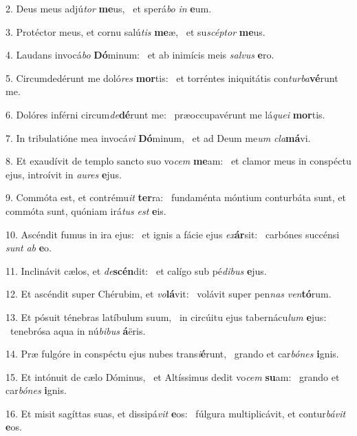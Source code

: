 2. Deus meus adjú\textit{tor} \textbf{me}us, \ast\  et sperá\textit{bo} \textit{in} \textbf{e}um.\

3. Protéctor meus, et cornu salú\textit{tis} \textbf{me}æ, \ast\  et su\textit{scép}\textit{tor} \textbf{me}us.\

4. Laudans invocá\textit{bo} \textbf{Dó}minum: \ast\  et ab inimícis meis \textit{sal}\textit{vus} \textbf{e}ro.\

5. Circumdedérunt me doló\textit{res} \textbf{mor}tis: \ast\  et torréntes iniquitátis con\textit{tur}\textit{ba}\textbf{vé}runt me.\

6. Dolóres inférni circum\textit{de}\textbf{dé}runt me: \ast\  præoccupavérunt me lá\textit{que}\textit{i} \textbf{mor}tis.\

7. In tribulatióne mea invocá\textit{vi} \textbf{Dó}minum, \ast\  et ad Deum me\textit{um} \textit{cla}\textbf{má}vi.\

8. Et exaudívit de templo sancto suo vo\textit{cem} \textbf{me}am: \ast\  et clamor meus in conspéctu ejus, introívit in \textit{au}\textit{res} \textbf{e}jus.\

9. Commóta est, et contrému\textit{it} \textbf{ter}ra: \ast\  fundaménta móntium conturbáta sunt, et commóta sunt, quóniam irá\textit{tus} \textit{est} \textbf{e}is.\

10. Ascéndit fumus in ira ejus: \dag\  et ignis a fácie ejus \textit{ex}\textbf{ár}sit: \ast\  carbónes succénsi \textit{sunt} \textit{ab} \textbf{e}o.\

11. Inclinávit cælos, et \textit{de}\textbf{scén}dit: \ast\  et calígo sub pé\textit{di}\textit{bus} \textbf{e}jus.\

12. Et ascéndit super Chérubim, et \textit{vo}\textbf{lá}vit: \ast\  volávit super pen\textit{nas} \textit{ven}\textbf{tó}rum.\

13. Et pósuit ténebras latíbulum suum, \dag\  in circúitu ejus tabernácu\textit{lum} \textbf{e}jus: \ast\  tenebrósa aqua in nú\textit{bi}\textit{bus} \textbf{á}ëris.\

14. Præ fulgóre in conspéctu ejus nubes trans\textit{i}\textbf{é}runt, \ast\  grando et car\textit{bó}\textit{nes} \textbf{i}gnis.\

15. Et intónuit de cælo Dóminus, \dag\  et Altíssimus dedit vo\textit{cem} \textbf{su}am: \ast\  grando et car\textit{bó}\textit{nes} \textbf{i}gnis.\

16. Et misit sagíttas suas, et dissipá\textit{vit} \textbf{e}os: \ast\  fúlgura multiplicávit, et contur\textit{bá}\textit{vit} \textbf{e}os.\

